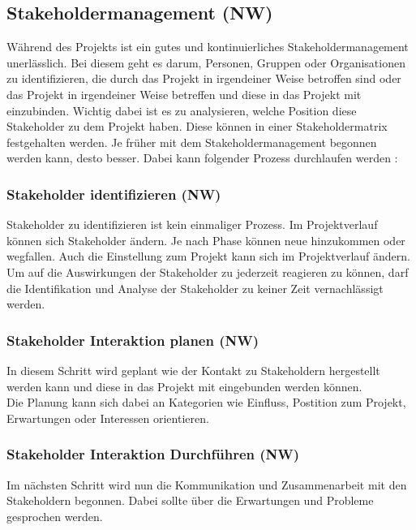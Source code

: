\documentclass[ThesisDJ.tex]{subfiles}
\begin{document}
\subsection{Stakeholdermanagement (NW)}

Während des Projekts ist ein gutes und kontinuierliches Stakeholdermanagement unerlässlich. 
Bei diesem geht es darum, Personen, Gruppen oder Organisationen zu identifizieren, die durch das Projekt in irgendeiner Weise betroffen sind oder das
Projekt in irgendeiner Weise betreffen und diese in das Projekt mit einzubinden. Wichtig dabei ist es zu analysieren, welche Position 
diese Stakeholder zu dem Projekt haben. Diese können in einer Stakeholdermatrix festgehalten werden. 
Je früher mit dem Stakeholdermanagement begonnen werden kann, desto besser.
Dabei kann folgender Prozess durchlaufen werden \cite[S.~487]{project_management_institute_guide_2017}:

\subsubsection{Stakeholder identifizieren (NW)}
Stakeholder zu identifizieren ist kein einmaliger Prozess. Im Projektverlauf können sich Stakeholder ändern. 
Je nach Phase können neue hinzukommen oder wegfallen. Auch die Einstellung zum Projekt kann sich im Projektverlauf ändern. 
Um auf die Auswirkungen der Stakeholder zu jederzeit reagieren zu können, darf die Identifikation und Analyse der Stakeholder 
zu keiner Zeit vernachlässigt werden.

\subsubsection{Stakeholder Interaktion planen (NW)}
In diesem Schritt wird geplant wie der Kontakt zu Stakeholdern hergestellt werden kann und diese in das Projekt mit eingebunden werden können.\\
Die Planung kann sich dabei an Kategorien wie Einfluss, Postition zum Projekt, Erwartungen oder Interessen orientieren.

\subsubsection{Stakeholder Interaktion Durchführen (NW)}
Im nächsten Schritt wird nun die Kommunikation und Zusammenarbeit mit den Stakeholdern begonnen. 
Dabei sollte über die Erwartungen und Probleme gesprochen werden.
\end{document}
